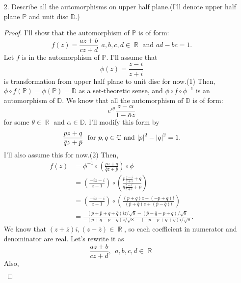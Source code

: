 \documentclass{article}
\DeclareMathOperator{\rr}{\mathbb{R}}
\begin{document}
\begin{enumerate}
\item[2.] Describe all the automorphisms on upper half plane.(I'll denote upper half plane $\mathbb{P}$ and unit disc $\mathbb{D}$.)
\begin{proof}
I'll show that the automorphism of $\mathbb{P}$ is of form:
\begin{equation*}
f(z)=\frac{az+b}{cz+d}~~a,b,c,d\in \rr\text{ and }ad-bc=1.
\end{equation*}
Let $f$ is in the automorphism of $\mathbb{P}$. I'll assume that
\begin{equation*}
\phi(z)=\frac{z-i}{z+i}
\end{equation*}
is transformation from upper half plane to unit disc for now.(1) Then, $\phi\circ f(\mathbb{P})=\phi(\mathbb{P})=\mathbb{D}$ as a set-theoretic sense, and $\phi \circ f \circ \phi^{-1}$ is an automorphism of $\mathbb{D}$. We know that all the automorphism of $\mathbb{D}$ is of form:
\begin{equation*}
e^{i\theta}\frac{z-\alpha}{1-\bar{\alpha}z}
\end{equation*}
for some $\theta\in \rr$ and $\alpha\in \mathbb{D}$. I'll modify this form by
\begin{equation*}
\frac{pz+q}{\bar{q}z+\bar{p}}~~\text{for }p,q\in \mathbb{C}\text{ and }\abs{p}^2-\abs{q}^2=1.
\end{equation*}
I'll also assume this for now.(2) Then,
\begin{equation*}
\begin{split}
f(z)&=\phi^{-1}\circ \left(\frac{pz+q}{\bar{q}z+\bar{p}}\right)\circ \phi \\
&=\left(\frac{-iz-i}{z-1}\right)\circ\left(\frac{p\frac{z-i}{z+i}+q}{\bar{q}\frac{z-i}{z+i}+\bar{p}}\right) \\
&=\left(\frac{-iz-i}{z-1}\right)\circ \left(\frac{(p+q)z+(-p+q)i}{(\bar{p}+\bar{q})z+(\bar{p}-\bar{q})i}\right) \\
&=\frac{(p+\bar{p}+q+\bar{q})iz/\sqrt{8}-(\bar{p}-\bar{q}-p+q)/\sqrt{8}}{-(p+q-\bar{p}-\bar{q})z/\sqrt{8}-(-p-\bar{p}+q+\bar{q})i/\sqrt{8}}.
\end{split}
\end{equation*}
We know that $(z+\bar{z})i, (z-\bar{z})\in \rr$, so each coefficient in numerator and denominator are real. Let's rewrite it as
\begin{equation*}
\frac{az+b}{cz+d},~~a,b,c,d\in \rr
\end{equation*}
Also,
\begin{equation*}
\begin{split}

\end{split}
\end{equation*}
\end{proof}
\end{enumerate}
\end{document}
